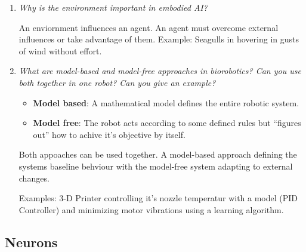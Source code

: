 \documentclass[
    fontsize      = 11pt,
    paper         = a4,
    twoside       = false,
    parskip       = half,
    pagesize      = false,
]{scrartcl}
\providecommand{\tightlist}{%
  \setlength{\itemsep}{0pt}\setlength{\parskip}{0pt}}
\begin{document}
\begin{enumerate}
  \textbf{(?)}
\item
  \emph{Why is the environment important in embodied AI?}

  An enviornment influences an agent. An agent must overcome external
  influences or take advantage of them. Example: Seagulls in hovering in
  gusts of wind without effort.
\item
  \emph{What are model-based and model-free approaches in biorobotics?
  Can you use both together in one robot? Can you give an example?}

  \begin{itemize}
  \tightlist
  \item
    \textbf{Model based}: A mathematical model defines the entire
    robotic system.
  \item
    \textbf{Model free}: The robot acts according to some defined rules
    but ``figures out'' how to achive it's objective by itself.
  \end{itemize}

  Both appoaches can be used together. A model-based approach defining
  the systems baseline behviour with the model-free system adapting to
  external changes.

  Examples: 3-D Printer controlling it's nozzle temperatur with a model
  (PID Controller) and minimizing motor vibrations using a learning
  algorithm.
\end{enumerate}

\hypertarget{neurons}{%
\subsection{Neurons}\label{neurons}}
\end{document}
